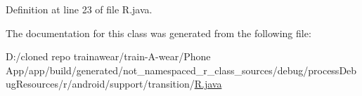 Definition at line 23 of file R.\+java.



The documentation for this class was generated from the following file\+:\begin{DoxyCompactItemize}
\item 
D\+:/cloned repo trainawear/train-\/\+A-\/wear/\+Phone App/app/build/generated/not\+\_\+namespaced\+\_\+r\+\_\+class\+\_\+sources/debug/process\+Debug\+Resources/r/android/support/transition/\mbox{\hyperlink{process_debug_resources_2r_2android_2support_2transition_2_r_8java}{R.\+java}}\end{DoxyCompactItemize}
